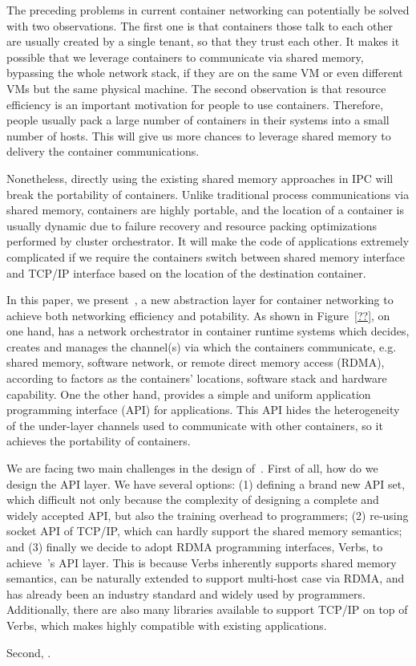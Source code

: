 The preceding problems in current container networking can potentially be solved with two observations.
The first one is that containers those talk to each other are usually created by a single tenant, so that they trust each other.
It makes it possible that we leverage containers to communicate via shared memory, bypassing the whole network stack, if they are on the same VM or even different VMs but the same physical machine. The second observation is that resource efficiency is an important motivation for people to use containers. Therefore, people usually pack a large number of containers in their systems into a small number of hosts. This will give us more chances to leverage shared memory to delivery the container communications.

Nonetheless, directly using the existing shared memory approaches in IPC will break the portability of containers. Unlike traditional process
communications via shared memory, containers are highly portable, and the location of a container is usually dynamic due to failure recovery and resource packing optimizations performed by cluster orchestrator. It will make the code of applications extremely complicated if we require the containers switch between shared memory interface and TCP/IP interface based on the location of the destination container.

In this paper, we present~\sysname, a new abstraction layer for container networking to achieve both networking efficiency and potability. 
As shown in Figure~\ref{??}, on one hand, \sysname has a network orchestrator in container runtime systems which decides, creates and manages the channel(s) via which the containers communicate, e.g. shared memory, software network, or remote direct memory access (RDMA), according to factors as the containers' locations, software stack and hardware capability. One the other hand, \sysname provides a simple and uniform application programming interface (API) for applications. This API hides the heterogeneity of the under-layer channels used
to communicate with other containers, so it achieves the portability of containers.   

We are facing two main challenges in the design of~\sysname. First of all, how do we design the API layer. We have several options: (1) defining a brand new API set, which difficult not only because the complexity of designing a complete and widely accepted API, but also the training overhead to programmers; (2) re-using socket API of TCP/IP, which can hardly support the shared memory semantics; and
(3) finally we decide to adopt RDMA programming interfaces, Verbs, to achieve~\sysname's API layer. This is because Verbs inherently supports shared memory semantics, can be naturally extended to support multi-host case via RDMA, and has already been an industry standard and widely used by programmers. Additionally, there are also many libraries available to support TCP/IP on top of Verbs, which makes \sysname highly compatible with existing applications.

Second, .